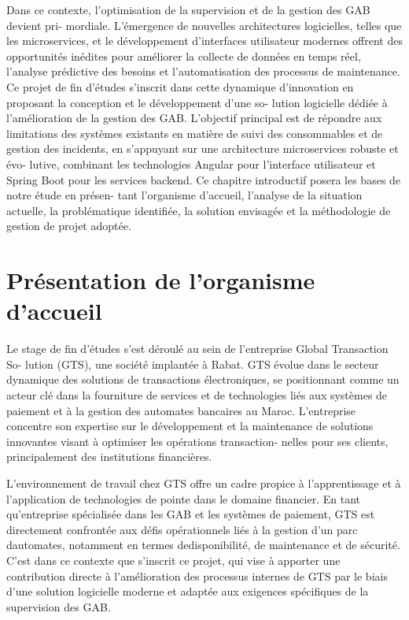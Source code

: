 \documentclass[a4paper,15pt]{report}
\begin{document}
	Dans ce contexte, l’optimisation de la supervision et de la gestion des GAB devient pri-
	mordiale. L’émergence de nouvelles architectures logicielles, telles que les microservices,
	et le développement d’interfaces utilisateur modernes offrent des opportunités inédites
	pour améliorer la collecte de données en temps réel, l’analyse prédictive des besoins et
	l’automatisation des processus de maintenance. Ce projet de fin d’études s’inscrit dans
	cette dynamique d’innovation en proposant la conception et le développement d’une so-
	lution logicielle dédiée à l’amélioration de la gestion des GAB. L’objectif principal est de
	répondre aux limitations des systèmes existants en matière de suivi des consommables et
	de gestion des incidents, en s’appuyant sur une architecture microservices robuste et évo-
	lutive, combinant les technologies Angular pour l’interface utilisateur et Spring Boot pour
	les services backend. Ce chapitre introductif posera les bases de notre étude en présen-
	tant l’organisme d’accueil, l’analyse de la situation actuelle, la problématique identifiée,
	la solution envisagée et la méthodologie de gestion de projet adoptée.
	
	\section{Présentation de l’organisme d’accueil}
	\label{sec:organisme}
	 Le stage de fin d’études s’est déroulé au sein de l’entreprise Global Transaction So-
	 lution (GTS), une société implantée à Rabat. GTS évolue dans le secteur dynamique
	 des solutions de transactions électroniques, se positionnant comme un acteur clé dans la
	 fourniture de services et de technologies liés aux systèmes de paiement et à la gestion des
	 automates bancaires au Maroc. L’entreprise concentre son expertise sur le développement
	 et la maintenance de solutions innovantes visant à optimiser les opérations transaction-
	 nelles pour ses clients, principalement des institutions financières.
	 
	 L’environnement de travail chez GTS offre un cadre propice à l’apprentissage et à
	 l’application de technologies de pointe dans le domaine financier. En tant qu’entreprise
	 spécialisée dans les GAB et les systèmes de paiement, GTS est directement confrontée
	 aux défis opérationnels liés à la gestion d’un parc dautomates, notamment en termes dedisponibilité, de maintenance et de sécurité. C’est dans ce contexte que s’inscrit ce projet,
	 qui vise à apporter une contribution directe à l’amélioration des processus internes de
	 GTS par le biais d’une solution logicielle moderne et adaptée aux exigences spécifiques
	 de la supervision des GAB.
\end{document}
